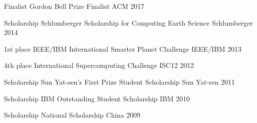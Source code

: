 \documentclass[11pt, a4paper]{awesome-cv}
\begin{document}
\begin{cvhonors}

  \cvhonor
    {Finalist} %
    {Gordon Bell Prize Finalist} %
    {ACM} %
    {2017} %
    
  \cvhonor
    {Scholarship} %
    {Schlumberger Scholarship for Computing Earth Science} %
    {Schlumberger} %
    {2014} %

  \cvhonor
    {1st place} %
    {IEEE/IBM International Smarter Planet Challenge} %
    {IEEE/IBM}
    {2013} %

  \cvhonor
    {4th place} %
    {International Supercomputing Challenge} %
    {ISC12} %
    {2012} %

  \cvhonor
    {Scholarship} %
    {Sun Yat-sen’s First Prize Student Scholarship} %
    {Sun Yat-sen} %
    {2011} %

  \cvhonor
    {Scholarship} %
    {IBM Outstanding Student Scholarship} %
    {IBM} %
    {2010} %

  \cvhonor
    {Scholarship} %
    {National Scholarship} %
    {China} %
    {2009} %
\end{cvhonors}

\end{document}
